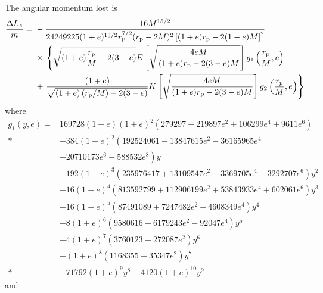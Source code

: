 The angular momentum lost is
\begin{align}
\frac{\Delta L_z}{m} = {} & - \frac{16 M^{{15}/{2}}}{24249225 (1 + e)^{{13}/{2}} r_\mathrm{p}^{{7}/{2}} (r_\mathrm{p} - 2 M)^2 \left[(1 + e) r_\mathrm{p} - 2 (1 - e) M\right]^{2}} \nonumber \\
 {} & \times {} \left\{\sqrt{(1 + e) \frac{r_\mathrm{p}}{M} - 2(3 - e)} E\left[\sqrt{\frac{4 e M}{(1+e) r_\mathrm{p} - 2(3 - e)M}}\right] g_1\left(\frac{r_\mathrm{p}}{M}, e\right) \right. \nonumber \\
 {} & + \left. \frac{(1 + e)}{\sqrt{(1 + e)\left(r_\mathrm{p}/M\right) - 2(3 - e)}} K\left[\sqrt{\frac{4 e M}{(1+e) r_\mathrm{p} - 2(3 - e)M}}\right] g_2\left(\frac{r_{p}}{M}, e\right)\right\}
\end{align}
where
\begin{align}
g_1(y, e) = {} & 169728 (1 - e) (1 + e)^2 \left(279297 + 219897 e^2 + 106299 e^4 + 9611 e^6 \right) \nonumber \\*
 {} & - \left. 384 (1 + e)^2 \left(192524061 - 13847615 e^2 - 36165965 e^4 \right.\right. \nonumber \\
 {} &- \left.\left. 20710173 e^6 - 588532 e^8\right) y \right. \nonumber \\
 {} & + \left. 192 (1 + e)^3 \left(235976417 + 13109547 e^2 - 3369705 e^4 - 3292707e^6\right) y^2 \right. \nonumber \\
 {} & - \left. 16 (1 + e)^4 \left(813592799 + 112906199 e^2 + 53843933 e^4 + 602061 e^6\right) y^3 \right. \nonumber \\
 {} & + \left. 16 (1 + e)^5 \left(87491089 + 7247482 e^2 + 4608349 e^4\right) y^4 \right. \nonumber \\
 {} & + \left. 8 (1 + e)^6 \left(9580616 + 6179243 e^2 - 92047 e^4\right) y^5 \right. \nonumber \\
 {} & - \left. 4 (1 + e)^7 \left(3760123 + 272087 e^2 \right) y^6 \right. \nonumber \\
 {} & - \left. (1 + e)^8 \left(1168355 - 35347 e^2\right) y^7 \right. \nonumber \\*
 {} & - \left. 71792 (1 + e)^9 y^8 - 4120 (1 + e)^{10} y^9 \right.
\end{align}
and
